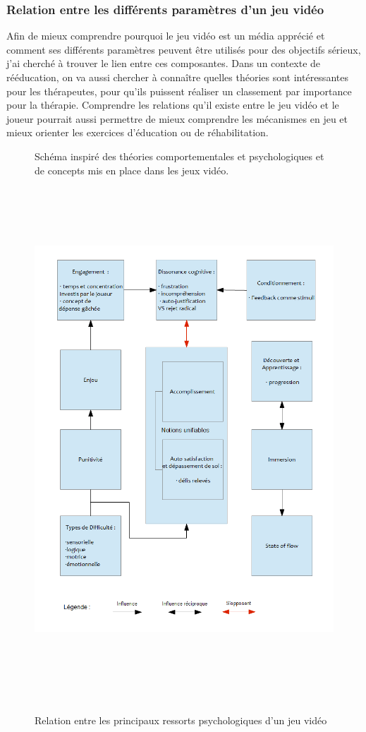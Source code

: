 	\subsubsection*{Relation entre les différents paramètres d'un jeu vidéo}
Afin de mieux comprendre pourquoi le jeu vidéo est un média apprécié et comment ses différents paramètres peuvent être utilisés pour des objectifs sérieux, j'ai cherché à trouver le lien entre ces composantes. Dans un contexte de rééducation, on va aussi chercher à connaître quelles théories sont intéressantes pour les thérapeutes, pour qu'ils puissent réaliser un classement par importance pour la thérapie. Comprendre les relations qu'il existe entre le jeu vidéo et le joueur pourrait aussi permettre de mieux comprendre les mécanismes en jeu et mieux orienter les exercices d'éducation ou de réhabilitation.
\begin{figure}[htbp]
Schéma inspiré des théories comportementales et psychologiques et de concepts mis en place dans les jeux vidéo.
	\centering
	\includegraphics[height=19.6cm]{images/lien_theories}
	\caption{Relation entre les principaux ressorts psychologiques d'un jeu vidéo}
	\label{lien_theories}
\end{figure}			

